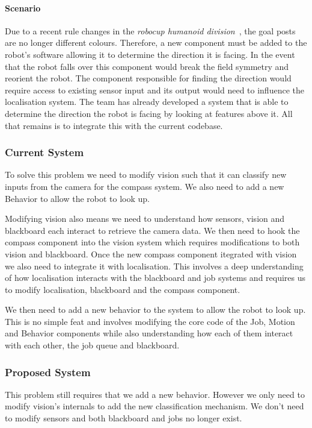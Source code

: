 \documentclass[english,12pt]{scrartcl}
\begin{document}
			\paragraph{Scenario} Due to a recent rule changes in the 
			\emph{\gls{robocup} humanoid division}~\cite[Section 1.2]{humanoid2013rules}, the goal posts are no longer different colours.
			Therefore, a new component must be added to the robot's software allowing it to determine the
			direction it is facing. In the event that the robot falls over this component would break the
			field symmetry and reorient the robot. The component responsible for finding the direction would
			require access to existing sensor input and its output would need to influence the localisation
			system. The team has already developed a system that is able to determine the direction the
			robot is facing by looking at features above it. All that remains is to integrate this with the current codebase.

			\subsubsection{Current System}
				To solve this problem we need to modify vision such that it can classify
				new inputs from the camera for the compass system. 
				We also need to add a new Behavior to allow the robot to look up.
				
				Modifying vision also means we need to understand how sensors, vision and blackboard each interact
				to retrieve the camera data. 
				We then need to hook the compass component into the vision system which requires modifications to both vision
				and blackboard.
				Once the new compass component itegrated with vision we also need to integrate it with localisation. 
				This involves a deep understanding of how localisation interacts with the blackboard and job systems and
				requires us to modify localisation, blackboard and the compass component.
				
				We then need to add a new behavior to the system to allow the robot to look up.
				This is no simple feat and involves modifying the core code of the Job, Motion and Behavior components while also understanding
				how each of them interact with each other, the job queue and blackboard.
			\subsubsection{Proposed System}
				This problem still requires that we add a new behavior.
				However we only need to modify vision's internals to add the new classification mechanism.
				We don't need to modify sensors and both blackboard and jobs no longer exist.
				
\end{document}
